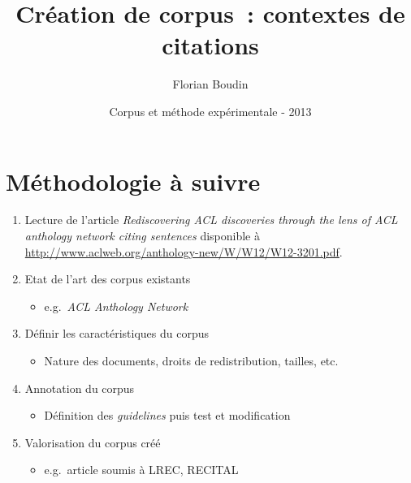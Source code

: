 \documentclass[12pt,a4paper]{article}
\begin{document}
\title{Création de corpus~: contextes de citations}
\author{Florian Boudin}
\date{Corpus et méthode expérimentale - 2013}

\maketitle

\section{Méthodologie à suivre}

\begin{enumerate}
    \item Lecture de l'article \textit{Rediscovering ACL discoveries through the lens of ACL anthology network citing sentences} disponible à \url{http://www.aclweb.org/anthology-new/W/W12/W12-3201.pdf}.
    \item Etat de l'art des corpus existants
    \begin{itemize}
        \item e.g.~\textit{ACL Anthology Network}
    \end{itemize}
    \item Définir les caractéristiques du corpus
    \begin{itemize}
        \item Nature des documents, droits de redistribution, tailles, etc.
    \end{itemize}
    \item Annotation du corpus
    \begin{itemize}
        \item Définition des \textit{guidelines} puis test et modification
    \end{itemize}
    \item Valorisation du corpus créé
    \begin{itemize}
        \item e.g.~article soumis à LREC, RECITAL
    \end{itemize}

\end{enumerate}
\end{document}

